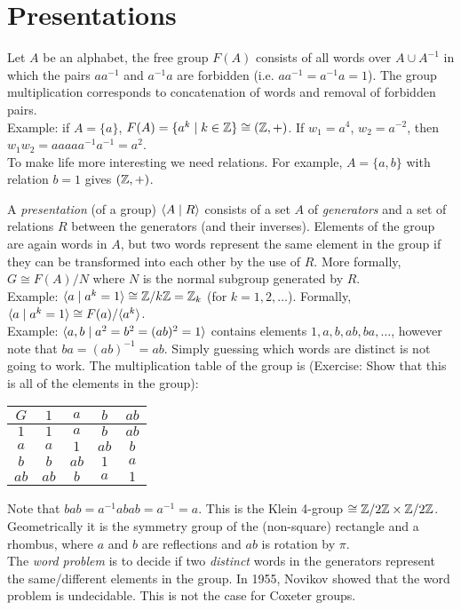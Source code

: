 \section{Presentations}

Let $A$ be an alphabet, the free group $F(A)$ consists of all words over $A
\cup A^{-1}$ in which the pairs $aa^{-1}$ and $a^{-1}a$ are forbidden (i.e.
$aa^{-1}=a^{-1}a=1$). The group multiplication corresponds to concatenation of
words and removal of forbidden pairs.
\\

Example: if $A = \{a\}$, $F(A) = \{a^k \mid k \in \mathbb{Z}\} \cong (\mathbb{Z},+)$.
If $w_1 = a^4$, $w_2 = a^{-2}$, then $w_1 w_2 = a a a a a^{-1} a^{-1} = a^2$.
\\

To make life more interesting we need relations.
For example, $A = \{a, b\}$ with relation $b=1$ gives $(\mathbb{Z}, +)$.

A {\em presentation} (of a group) $\langle A \mid R \rangle$ consists of
a set $A$ of {\em generators} and a set of relations $R$ between the generators
(and their inverses). Elements of the group are again words in $A$, but two
words represent the same element in the group if they can be transformed into
each other by the use of $R$. More formally, $G \cong F(A)/N$ where $N$ is the
normal subgroup generated by $R$.
\\

Example: $\langle a \mid a^k = 1 \rangle \cong \mathbb{Z}/k\mathbb{Z} = \mathbb{Z}_k$
(for $k = 1, 2, \dots$). Formally, $\langle a \mid a^k = 1 \rangle \cong F(a)/\langle a^k \rangle$.
\\

Example: $\langle a,b \mid a^2 = b^2 = (ab)^2 = 1 \rangle$ contains elements
$1, a, b, ab, ba, \dots$, however note that $ba = (ab)^{-1} = ab$.
Simply guessing which words are distinct is not going to work.
The multiplication table of the group is (Exercise: Show that this is all of
the elements in the group):

\begin{tabular}{c||c|c|c|c}
$G$ & $1$ & $a$ & $b$ & $ab$ \\
\hline
\hline
$1$ & $1$ & $a$ & $b$ & $ab$ \\ \hline
$a$ & $a$ & $1$ & $ab$ & $b$ \\ \hline
$b$ & $b$ & $ab$ & $1$ & $a$ \\ \hline
$ab$ & $ab$ & $b$ & $a$ & $1$
\end{tabular}

Note that $bab = a^{-1}abab = a^{-1} = a$. This is the Klein 4-group
$\cong \mathbb{Z}/2\mathbb{Z} \times \mathbb{Z}/2\mathbb{Z}$. Geometrically it is the symmetry group of the
(non-square) rectangle and a rhombus,
where $a$ and $b$ are reflections and $ab$ is rotation by $\pi$.
\\

The {\em word problem} is to decide if two {\em distinct} words in the
generators represent the same/different elements in the group.
In 1955, Novikov showed that the word problem is undecidable. This is not the
case for Coxeter groups.
